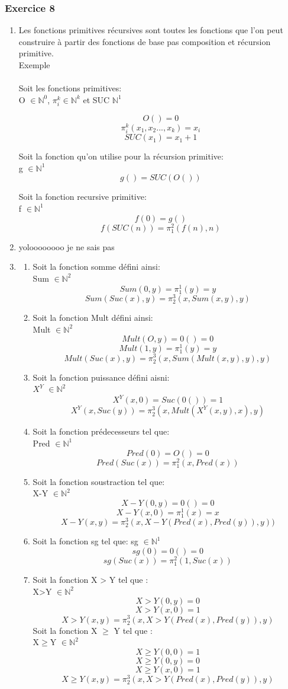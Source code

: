 \documentclass[]{article}
\begin{document}
\subsubsection{Exercice 8}
\begin{enumerate}
\item Les fonctions primitives récursives sont toutes les fonctions que l'on peut construire à partir des fonctions de base pas composition et récursion primitive.\\

  Exemple\\ \\
Soit les fonctions primitives: \\
O $\in \mathbb{N}^0$, $\pi_i^k \in \mathbb{N}^k$ et SUC $\mathbb{N}^1$ 

 \[O() = 0 \] 
\[\pi_i^k(x_1,x_2...,x_k) = x_i \] 
\[SUC(x_1) = x_1 + 1 \] 

Soit la fonction qu'on utilise pour la récursion primitive:\\
g $\in \mathbb{N}^1$
\[g() = SUC(O()) \]

Soit la fonction recursive primitive:\\
f $\in \mathbb{N}^1$
\[f(0) = g()\]
\[f(SUC(n)) = \pi_1^2(f(n),n)\]
  
\item  yoloooooooo je ne sais pas 
\item \begin{enumerate}\item Soit la fonction somme défini ainsi:\\
 Sum $\in \mathbb{N}^2$ 
\[Sum(0,y) = \pi_1^1(y) = y \]
\[Sum(Suc(x),y) = \pi_2^3(x,Sum(x,y),y)\]
\item Soit la fonction Mult défini ainsi: \\
Mult $\in \mathbb{N}^2$
\[Mult(O,y) = 0() = 0\]
\[Mult(1,y) = \pi_1^1(y) = y\]
\[Mult(Suc(x),y) = \pi_2^3(x,Sum(Mult(x,y),y),y)\]
\item Soit la fonction puissance défini aisni:\\
 $X^Y$ $\in \mathbb{N}^2$
\[X^Y(x,0) = Suc(0()) = 1\]
\[X^Y(x,Suc(y)) = \pi_2^3(x,Mult(X^Y(x,y),x),y)\]
\item Soit la fonction prédecesseurs tel que: \\
Pred $\in \mathbb{N}^1$
\[Pred(0) = O() = 0\]
\[Pred(Suc(x)) = \pi_1^2(x,Pred(x))\]
\item Soit la fonction soustraction tel que:\\
X-Y $\in \mathbb{N}^2$
\[X-Y(0,y) = 0() = 0\]
\[X-Y(x,0) = \pi_1^1(x) = x\]
\[X-Y(x,y) = \pi_2^3(x,X-Y(Pred(x),Pred(y)),y))\]
\item Soit la fonction sg tel que:
sg $\in \mathbb{N}^1$
\[sg(0) = 0() = 0\]
\[sg(Suc(x)) = \pi_1^2(1,Suc(x))\]
\item Soit la fonction X > Y tel que :\\
X>Y $\in \mathbb{N}^2$
\[X>Y(0,y) = 0\]
\[X>Y(x,0) = 1\]
\[X>Y(x,y) = \pi_2^3(x,X>Y(Pred(x),Pred(y)),y)\]
Soit la fonction X $\ge$ Y tel que :\\
X$\ge$Y $\in \mathbb{N}^2$
\[X\ge Y(0,0) = 1\]
\[X\ge Y(0,y) = 0\]
\[X\ge Y(x,0) = 1\]
\[X\ge Y(x,y) = \pi_2^3(x,X>Y(Pred(x),Pred(y)),y)\]


\end{enumerate}
\end{enumerate}
\end{document}
